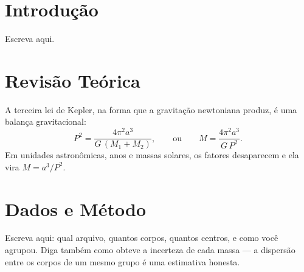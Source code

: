 \documentclass[10pt,a4paper,twocolumn]{article}
\begin{document}
\section{Introdução}

Escreva aqui.

\section{Revisão Teórica}

A terceira lei de Kepler, na forma que a gravitação newtoniana produz, é uma
balança gravitacional:
\begin{equation}
P^{2} = \frac{4\pi^{2}a^{3}}{G\,(M_1+M_2)} ,
\qquad\text{ou}\qquad
M = \frac{4\pi^{2}a^{3}}{G\,P^{2}} .
\label{eq:kepler3}
\end{equation}
Em unidades astronômicas, anos e massas solares, os fatores desaparecem e ela
vira $M = a^{3}/P^{2}$.

\section{Dados e Método}

Escreva aqui: qual arquivo, quantos corpos, quantos centros, e como você
agrupou. Diga também como obteve a incerteza de cada massa --- a dispersão
entre os corpos de um mesmo grupo é uma estimativa honesta.
\end{document}
